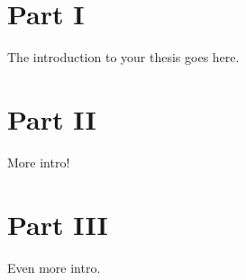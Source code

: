 
\section{Part I}

The introduction to your thesis goes here. 

\section{Part II}
More intro!

\section{Part III}
Even more intro.




